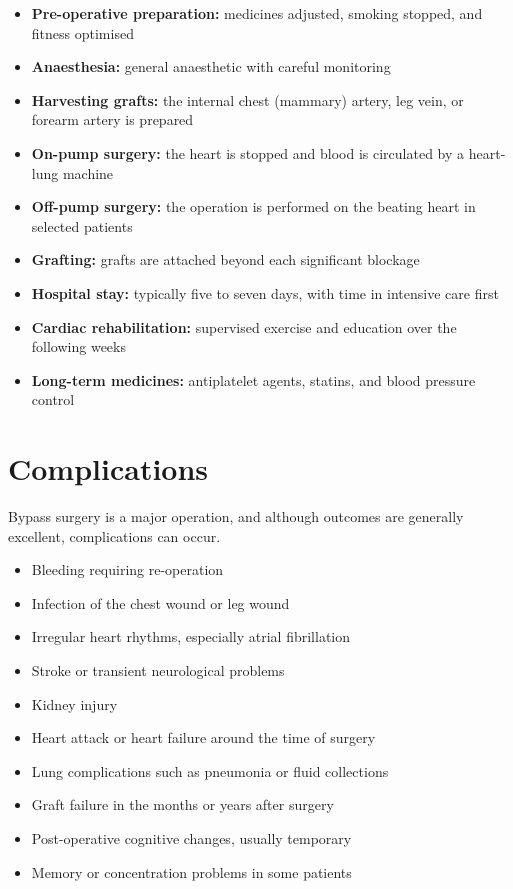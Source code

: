 \begin{itemize}
    \item \textbf{Pre-operative preparation:} medicines adjusted, smoking stopped, and fitness optimised
    \item \textbf{Anaesthesia:} general anaesthetic with careful monitoring
    \item \textbf{Harvesting grafts:} the internal chest (mammary) artery, leg vein, or forearm artery is prepared
    \item \textbf{On-pump surgery:} the heart is stopped and blood is circulated by a heart-lung machine
    \item \textbf{Off-pump surgery:} the operation is performed on the beating heart in selected patients
    \item \textbf{Grafting:} grafts are attached beyond each significant blockage
    \item \textbf{Hospital stay:} typically five to seven days, with time in intensive care first
    \item \textbf{Cardiac rehabilitation:} supervised exercise and education over the following weeks
    \item \textbf{Long-term medicines:} antiplatelet agents, statins, and blood pressure control
\end{itemize}

\section*{Complications}
Bypass surgery is a major operation, and although outcomes are generally excellent, complications can occur.

\begin{itemize}
    \item Bleeding requiring re-operation
    \item Infection of the chest wound or leg wound
    \item Irregular heart rhythms, especially atrial fibrillation
    \item Stroke or transient neurological problems
    \item Kidney injury
    \item Heart attack or heart failure around the time of surgery
    \item Lung complications such as pneumonia or fluid collections
    \item Graft failure in the months or years after surgery
    \item Post-operative cognitive changes, usually temporary
    \item Memory or concentration problems in some patients
\end{itemize}

